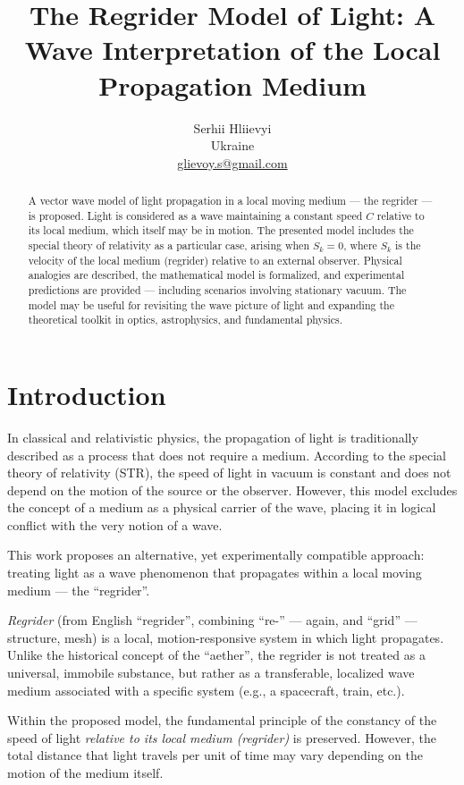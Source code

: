 \documentclass[12pt]{article}
\title{The Regrider Model of Light: A Wave Interpretation of the Local Propagation Medium}
\author{Serhii Hliievyi \\ Ukraine \\ \href{mailto:glievoy.s@gmail.com}{glievoy.s@gmail.com}}
\date{}
\begin{document}
\maketitle

\begin{abstract}
    A vector wave model of light propagation in a local moving medium — the regrider — is proposed. Light is considered as a wave maintaining a constant speed $C$ relative to its local medium, which itself may be in motion. The presented model includes the special theory of relativity as a particular case, arising when $S_k = 0$, where $S_k$ is the velocity of the local medium (regrider) relative to an external observer. Physical analogies are described, the mathematical model is formalized, and experimental predictions are provided — including scenarios involving stationary vacuum. The model may be useful for revisiting the wave picture of light and expanding the theoretical toolkit in optics, astrophysics, and fundamental physics.
    \end{abstract}    

\section*{Introduction}
    
In classical and relativistic physics, the propagation of light is traditionally described as a process that does not require a medium. According to the special theory of relativity (STR), the speed of light in vacuum is constant and does not depend on the motion of the source or the observer. However, this model excludes the concept of a medium as a physical carrier of the wave, placing it in logical conflict with the very notion of a wave.
    
This work proposes an alternative, yet experimentally compatible approach: treating light as a wave phenomenon that propagates within a local moving medium — the “regrider”.
    
\textit{Regrider} (from English “regrider”, combining “re-” — again, and “grid” — structure, mesh) is a local, motion-responsive system in which light propagates. Unlike the historical concept of the “aether”, the regrider is not treated as a universal, immobile substance, but rather as a transferable, localized wave medium associated with a specific system (e.g., a spacecraft, train, etc.).
    
Within the proposed model, the fundamental principle of the constancy of the speed of light \textit{relative to its local medium (regrider)} is preserved. However, the total distance that light travels per unit of time may vary depending on the motion of the medium itself.
    
\end{document}
